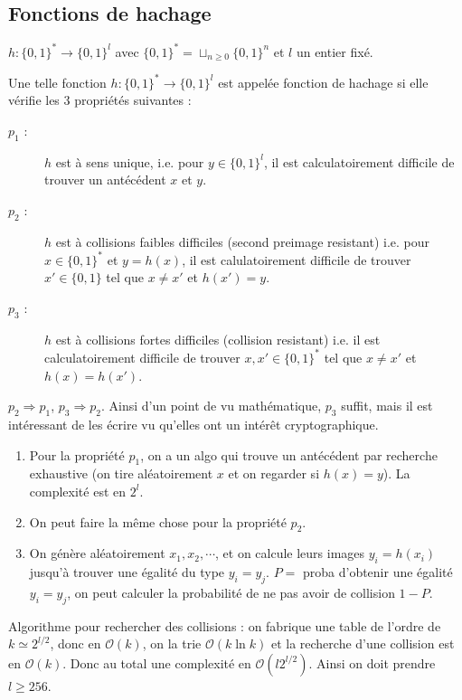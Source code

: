         \subsection{Fonctions de hachage}
            $h : \{0,1\}^* \to \{0,1\}^l$ avec $\{0,1\}^* = \sqcup_{n \geq 0} \{0,1\}^n$ et $l$ un entier fixé. 
            \begin{defi}
                Une telle fonction $h : \{0,1\}^* \to \{0,1\}^l$ est appelée fonction de hachage si elle vérifie les 3 propriétés suivantes : 
                \begin{description}
                    \item[$p_1$ :] $h$ est à sens unique, i.e. pour $y \in \{0,1\}^l$, il est calculatoirement difficile de trouver un antécédent $x$ et $y$. 
                    \item[$p_2$ :] $h$ est à collisions faibles difficiles (second preimage resistant) i.e. pour $x \in \{0,1\}^*$ et $y = h(x)$, il est calulatoirement difficile de trouver $x' \in \{0,1\}$ tel que $x \neq x'$ et $h(x') = y$.
                    \item[$p_3$ :] $h$ est à collisions fortes difficiles (collision resistant) i.e. il est calculatoirement difficile de trouver $x,x' \in \{0,1\}^*$ tel que $x \neq x'$ et $h(x) = h(x')$.   
                \end{description}
            \end{defi}
            \begin{remq}
                $p_2 \Rightarrow p_1$, $p_3 \Rightarrow p_2$. Ainsi d'un point de vu mathématique, $p_3$ suffit, mais il est intéressant de les écrire vu qu'elles ont un intérêt cryptographique.
            \end{remq}
            \begin{enumerate}
                \item Pour la propriété $p_1$, on a un algo qui trouve un antécédent par recherche exhaustive (on tire aléatoirement $x$ et on regarder si $h(x) = y$). La complexité est en $2^l$.
                \item On peut faire la même chose pour la propriété $p_2$. 
                \item On génère aléatoirement $x_1, x_2, \cdots$, et on calcule leurs images $y_i = h(x_i)$ jusqu'à trouver une égalité du type $y_i = y_j$. $P =$ proba d'obtenir une égalité $y_i = y_j$, on peut calculer la probabilité de ne pas avoir de collision $1 - P$.
            \end{enumerate}
            Algorithme pour rechercher des collisions : on fabrique une table de l'ordre de $k \simeq 2^{l/2}$, donc en $\mathcal{O}(k)$, on la trie $\mathcal{O}(k \ln k)$ et la recherche d'une collision est en $\mathcal{O}(k)$. Donc au total une complexité en $\mathcal{O}(l2^{l/2})$. Ainsi on doit prendre $l \geq 256$.

